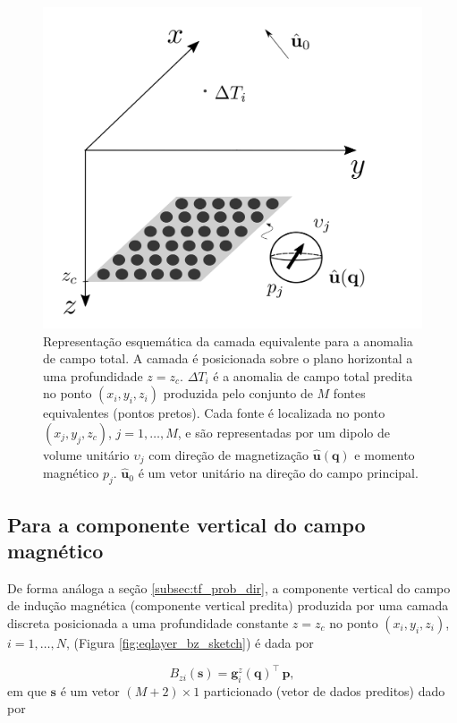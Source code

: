 \begin{figure}[H]
	\centering
	\includegraphics[width=.7\textwidth]{Fig/eqlayer/eqlayer_figure_tfa.png}
	\caption{Representação esquemática da camada equivalente para a anomalia de campo total. A camada é posicionada 
	sobre o plano horizontal a uma profundidade $z=z_{c}$. $\Delta T_{i}$ é a anomalia de campo total predita no ponto 
	$(x_{i},y_{i},z_{i})$ produzida pelo conjunto de $M$ fontes equivalentes (pontos pretos). Cada fonte é localizada 
	no ponto  $(x_{j},y_{j},z_{c})$, $j = 1, \dots, M$, e são representadas por um dipolo de volume unitário 
	$\upsilon_{j}$ com direção de magnetização $\hat{\mathbf{u}}(\mathbf{q})$ e momento magnético $p_{j}$. 
	$\hat{\mathbf{u}}_{0}$ é um vetor unitário na direção do campo principal.}
	\label{fig:eqlayer_tfa_sketch}
\end{figure}

\subsection{Para a componente vertical do campo magnético}
\label{subsec:bz_prob_dir}

De forma análoga a seção \ref{subsec:tf_prob_dir}, a componente vertical do campo de indução magnética (componente vertical predita) produzida por uma camada discreta posicionada a uma profundidade constante $z=z_c$ no ponto $(x_i,y_i,z_i)$, $i=1,\dots,N$, (Figura \ref{fig:eqlayer_bz_sketch}) é dada por 

\begin{equation}
B_{zi} (\mathbf{s})  = \mathbf{g}_{i}^{z}(\mathbf{q})^{\top} \, \mathbf{p},
\label{eq:pred_data_ith-z}
\end{equation}
em que $\mathbf{s}$ é um vetor $(M + 2) \times 1$ particionado (vetor de dados preditos) dado por 

